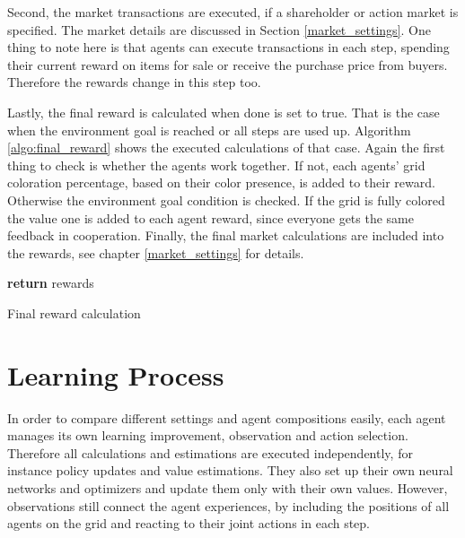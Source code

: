 Second, the market transactions are executed, if a shareholder or action market is specified. The market details are discussed in Section \ref{market_settings}. One thing to note here is that agents can execute transactions in each step, spending their current reward on items for sale or receive the purchase price from buyers. Therefore the rewards change in this step too.

Lastly, the final reward is calculated when done is set to true. That is the case when the environment goal is reached or all steps are used up. Algorithm \ref{algo:final_reward} shows the executed calculations of that case. Again the first thing to check is whether the agents work together. If not, each agents' grid coloration percentage, based on their color presence, is added to their reward. Otherwise the environment goal condition is checked. If the grid is fully colored the value one is added to each agent reward, since everyone gets the same feedback in cooperation. Finally, the final market calculations are included into the rewards, see chapter \ref{market_settings} for details.

\begin{algorithm}[H]
    \DontPrintSemicolon
    \textbf{return} rewards\;
    \caption{Final reward calculation}\label{algo:final_reward}
\end{algorithm}


\section{Learning Process}\label{learning_process}
In order to compare different settings and agent compositions easily, each agent manages its own learning improvement, observation and action selection. Therefore all calculations and estimations are executed independently, for instance policy updates and value estimations. They also set up their own neural networks and optimizers and update them only with their own values. However, observations still connect the agent experiences, by including the positions of all agents on the grid and reacting to their joint actions in each step.

